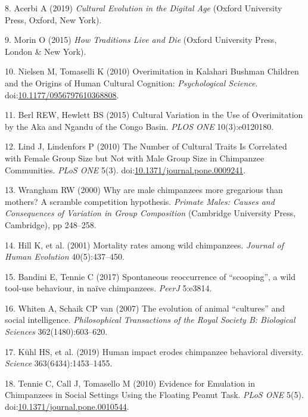 \documentclass[9pt,twocolumn,twoside,]{pnas-new}
\begin{document}
\hypertarget{ref-acerbi_cultural_2019}{}
8. Acerbi A (2019) \emph{Cultural Evolution in the Digital Age} (Oxford
University Press, Oxford, New York).

\hypertarget{ref-morin_how_2015}{}
9. Morin O (2015) \emph{How Traditions Live and Die} (Oxford University
Press, London \& New York).

\hypertarget{ref-nielsen_overimitation_2010}{}
10. Nielsen M, Tomaselli K (2010) Overimitation in Kalahari Bushman
Children and the Origins of Human Cultural Cognition:
\emph{Psychological Science}.
doi:\href{https://doi.org/10.1177/0956797610368808}{10.1177/0956797610368808}.

\hypertarget{ref-berl_cultural_2015}{}
11. Berl REW, Hewlett BS (2015) Cultural Variation in the Use of
Overimitation by the Aka and Ngandu of the Congo Basin. \emph{PLOS ONE}
10(3):e0120180.

\hypertarget{ref-lind_number_2010}{}
12. Lind J, Lindenfors P (2010) The Number of Cultural Traits Is
Correlated with Female Group Size but Not with Male Group Size in
Chimpanzee Communities. \emph{PLoS ONE} 5(3).
doi:\href{https://doi.org/10.1371/journal.pone.0009241}{10.1371/journal.pone.0009241}.

\hypertarget{ref-wrangham_why_2000}{}
13. Wrangham RW (2000) Why are male chimpanzees more gregarious than
mothers? A scramble competition hypothesis. \emph{Primate Males: Causes
and Consequences of Variation in Group Composition} (Cambridge
University Press, Cambridge), pp 248--258.

\hypertarget{ref-hill_mortality_2001}{}
14. Hill K, et al. (2001) Mortality rates among wild chimpanzees.
\emph{Journal of Human Evolution} 40(5):437--450.

\hypertarget{ref-bandini_spontaneous_2017}{}
15. Bandini E, Tennie C (2017) Spontaneous reoccurrence of ``scooping'',
a wild tool-use behaviour, in naïve chimpanzees. \emph{PeerJ} 5:e3814.

\hypertarget{ref-whiten_evolution_2007}{}
16. Whiten A, Schaik CP van (2007) The evolution of animal ``cultures''
and social intelligence. \emph{Philosophical Transactions of the Royal
Society B: Biological Sciences} 362(1480):603--620.

\hypertarget{ref-kuhl_human_2019}{}
17. Kühl HS, et al. (2019) Human impact erodes chimpanzee behavioral
diversity. \emph{Science} 363(6434):1453--1455.

\hypertarget{ref-tennie_evidence_2010}{}
18. Tennie C, Call J, Tomasello M (2010) Evidence for Emulation in
Chimpanzees in Social Settings Using the Floating Peanut Task.
\emph{PLoS ONE} 5(5).
doi:\href{https://doi.org/10.1371/journal.pone.0010544}{10.1371/journal.pone.0010544}.
\end{document}
